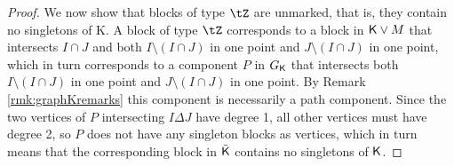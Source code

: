 \documentclass[11pt, a4paper, oneside, reqno]{amsart}
\newcommand{\sK}{{\sf K}}
\theoremstyle{remark}
\theoremstyle{definition}
\numberwithin{equation}{section}
\begin{document}
\begin{proof}
	We now show that blocks of type $\tZ$ are unmarked, that is, they contain no singletons of \sK. A block of type $\tZ$ corresponds to a block in ${\sf K} \vee M$ that intersects $I \cap J$ and both $I\setminus (I\cap J)$ in one point and $J \setminus (I \cap J)$ in one point, which in turn corresponds to a component $P$ in $G_{\sf K}$ that intersects both $I \setminus (I\cap J)$ in one point and $J \setminus (I\cap J)$ in one point. By Remark \ref{rmk:graphKremarks} this component is necessarily a path component. Since the two vertices of $P$ intersecting $I \Delta  J$ have degree 1, all other vertices must have degree 2, so $P$ does not have any singleton blocks as vertices, which in turn means that the corresponding block in $\tilde{\sK}$ contains no singletons of ${\sK}$.
\end{proof}
\end{document}
